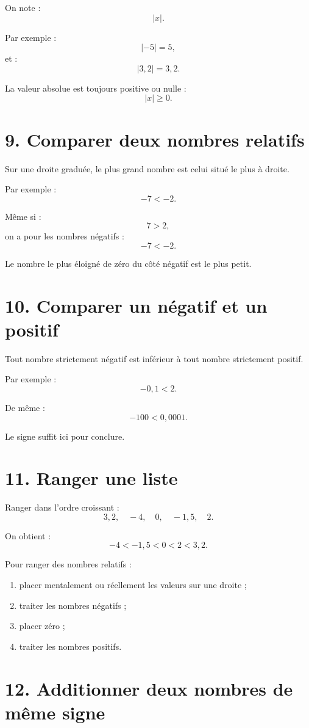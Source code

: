 On note :
\[
|x|.
\]

Par exemple :
\[
|-5|=5,
\]
et :
\[
|3{,}2|=3{,}2.
\]

La valeur absolue est toujours positive ou nulle :
\[
|x|\ge0.
\]

\section{9. Comparer deux nombres relatifs}

Sur une droite graduée, le plus grand nombre est celui situé le plus à droite.

Par exemple :
\[
-7<-2.
\]

Même si :
\[
7>2,
\]
on a pour les nombres négatifs :
\[
-7<-2.
\]

Le nombre le plus éloigné de zéro du côté négatif est le plus petit.

\section{10. Comparer un négatif et un positif}

Tout nombre strictement négatif est inférieur à tout nombre strictement positif.

Par exemple :
\[
-0{,}1<2.
\]

De même :
\[
-100<0{,}0001.
\]

Le signe suffit ici pour conclure.

\section{11. Ranger une liste}

Ranger dans l'ordre croissant :
\[
3{,}2,\quad -4,\quad 0,\quad -1{,}5,\quad 2.
\]

On obtient :
\[
\boxed{-4<-1{,}5<0<2<3{,}2}.
\]

\begin{methode}
Pour ranger des nombres relatifs :
\begin{enumerate}
\item placer mentalement ou réellement les valeurs sur une droite ;
\item traiter les nombres négatifs ;
\item placer zéro ;
\item traiter les nombres positifs.
\end{enumerate}
\end{methode}

\section{12. Additionner deux nombres de même signe}

